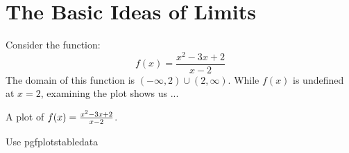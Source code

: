 \section{The Basic Ideas of Limits}{}{}


Consider the function:
\[
f(x) = \frac{x^2 - 3x + 2}{x-2}
\]
The domain of this function is $(-\infty, 2)\cup(2,\infty)$. While
$f(x)$ is undefined at $x=2$, examining the plot shows us ...

\begin{marginfigure}
  \caption{A plot of $f(x)=\protect\frac{x^2 - 3x + 2}{x-2}$.}
  \label{plot:(x^2 - 3x + 2)/(x-2)}
\end{marginfigure}

Use pgfplotstabledata
